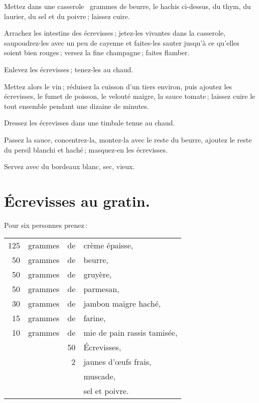 Mettez dans une casserole {\mmm} grammes de beurre, le hachis ci-dessus, du thym,
du laurier, du sel et du poivre ; laissez cuire.

Arrachez les intestins des écrevisses ; jetez-les vivantes dans la casserole,
saupoudrez-les avec un peu de cayenne et faites-les sauter jusqu'à ce qu'elles
soient bien rouges ; versez la fine champagne ; faites flamber.

Enlevez les écrevisses ; tenez-les au chaud.

Mettez alors le vin ; réduisez la cuisson d'un tiers environ, puis ajoutez les
écrevisses, le fumet de poisson, le velouté maigre, la sauce tomate ; laissez
cuire le tout ensemble pendant une dizaine de minutes.

Dressez les écrevisses dans une timbale tenue au chaud.

Passez la sauce, concentrez-la, montez-la avec le reste du beurre, ajoutez le
reste du persil blanchi et haché ; masquez-en les écrevisses.

Servez avec du bordeaux blanc, sec, vieux.

\section*{\centering Écrevisses au gratin.}

Pour six personnes prenez :

\footnotesize
\begin{longtable}{rrrp{16em}}
  125 & grammes    & de & crème épaisse,                                                                  \\
   50 & grammes    & de & beurre,                                                                         \\
   50 & grammes    & de & gruyère,                                                                        \\
   50 & grammes    & de & parmesan,                                                                       \\
   30 & grammes    & de & jambon maigre haché,                                                            \\
   15 & grammes    & de & farine,                                                                         \\
   10 & grammes    & de & mie de pain rassis tamisée,                                                     \\
      &            & 50 & Écrevisses,                                                                     \\
      &            &  2 & jaunes d'œufs frais,                                                            \\
      &            &    & muscade,                                                                        \\
      &            &    & sel et poivre.                                                                  \\
\end{longtable}
\normalsize


